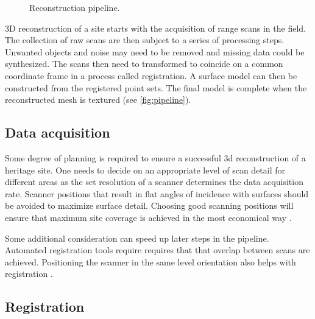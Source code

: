 \begin{figure}

	\caption{Reconstruction pipeline.}
	\label{fig:pipeline}

\end{figure}


3D reconstruction of a site starts with the acquisition of range scans in the field. The collection of raw scans are then subject to a series of processing steps. Unwanted objects and noise may need to be removed and missing data could be synthesized. The scans then need to transformed to coincide on a common coordinate frame in a process called registration. A surface model can then be constructed from the registered point sets. The final model is complete when the reconstructed mesh is textured (see \autoref{fig:pipeline}).

\subsection{Data acquisition}
Some degree of planning is required to ensure a successful 3d reconstruction of a heritage site. One needs to decide on an appropriate level of scan detail for different areas as the set resolution of a scanner determines the data acquisition rate. Scanner positions that result in flat angles of incidence with surfaces should be avoided to maximize surface detail. Choosing good scanning positions will ensure that maximum site coverage is achieved in the most economical way \cite{Ruther2011}.

Some additional consideration can speed up later steps in the pipeline. Automated registration tools require requires that that overlap between scans are achieved. Positioning the scanner in the same level orientation also helps with registration \cite{Ruther2011}.

\subsection{Registration}  

